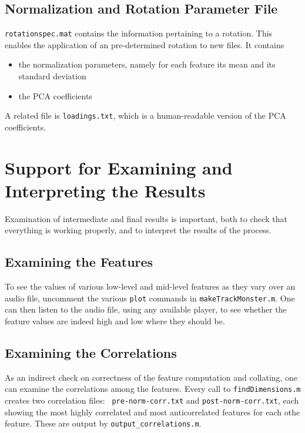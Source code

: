 \documentclass[11pt]{article}
\begin{document}
\subsection{Normalization and Rotation Parameter File}

{\tt rotationspec.mat}  contains the information pertaining to a
rotation.  This enables the application of an pre-determined rotation 
to new files.  It contains 

\begin{itemize}  \setlength{\itemsep}{0pt}\setlength{\parskip}{0pt}
\item the normalization parameters, namely for each feature its mean
  and its standard deviation

\item the PCA coefficients
\end{itemize}

A related file is {\tt loadings.txt}, which is a human-readable
version of the PCA coefficients.


\section{Support for Examining and Interpreting the Results}

Examination of intermediate and final results is important, both to
check that everything is working properly, and to interpret the
results of the process.

\subsection{Examining the Features}

To see the values of various low-level and mid-level features as they
vary over an audio file, uncomment the various {\tt plot} commands in
{\tt makeTrackMonster.m}.  One can then listen to the audio file,
using any available player, to see whether the feature values are
indeed high and low where they should be.

\subsection{Examining the Correlations}

As an indirect check on correctness of the feature computation and
collating, one can examine the correlations among the features.  Every
call to {\tt findDimensions.m} creates two correlation files: {\tt
  pre-norm-corr.txt} and {\tt post-norm-corr.txt}, each showing the
most highly correlated and most anticorrelated features for each othe
feature.  These are output by {\tt output\_correlations.m}.
\end{document}
